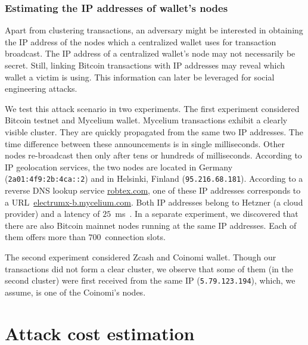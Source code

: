 \subsubsection*{Estimating the IP addresses of wallet's nodes}

Apart from clustering transactions, an adversary might be interested in obtaining the IP address of the nodes which a centralized wallet uses for transaction broadcast.
The IP address of a centralized wallet's node may not necessarily be secret.
Still, linking Bitcoin transactions with IP addresses may reveal which wallet a victim is using.
This information can later be leveraged for social engineering attacks.

We test this attack scenario in two experiments.
The first experiment considered Bitcoin testnet and Mycelium wallet.
Mycelium transactions exhibit a clearly visible cluster.
They are quickly propagated from the same two IP addresses.
The time difference between these announcements is in single milliseconds.
Other nodes re-broadcast then only after tens or hundreds of milliseconds.
According to IP geolocation services, the two nodes are located in Germany (\texttt{2a01:4f9:2b:4ca::2}) and in Helsinki, Finland (\texttt{95.216.68.181}).
According to a reverse DNS lookup service \url{robtex.com}, one of these IP addresses corresponds to a URL~\url{electrumx-b.mycelium.com}.
Both IP addresses belong to Hetzner (a cloud provider) and a latency of $25$~ms~\cite{Bitnodes}.
In a separate experiment, we discovered that there are also Bitcoin mainnet nodes running at the same IP addresses.
Each of them offers more than $700$~connection slots.

The second experiment considered Zcash and Coinomi wallet.
Though our transactions did not form a clear cluster, we observe that some of them (in the second cluster) were first received from the same IP (\texttt{5.79.123.194}), which, we assume, is one of the Coinomi's nodes.


\section{Attack cost estimation}

